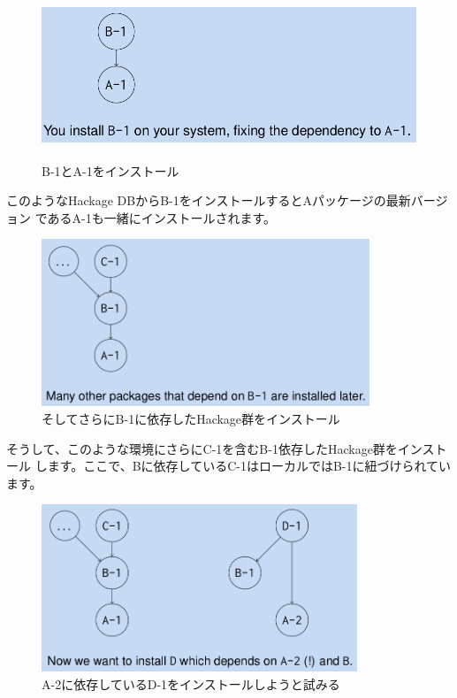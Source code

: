 \documentclass[mingoth,a4paper]{jsarticle}
\begin{document}
\begin{figure}[ht]
  \begin{center}
    \includegraphics[height=5cm]{image201110/cabal-2.png}
  \end{center}
  \label{fig:cabal-2}\caption{B-1とA-1をインストール}
\end{figure}

このようなHackage DBからB-1をインストールするとAパッケージの最新バージョン
であるA-1も一緒にインストールされます。

\begin{figure}[ht]
  \begin{center}
    \includegraphics[height=5cm]{image201110/cabal-3.png}
  \end{center}
  \label{fig:cabal-3}\caption{そしてさらにB-1に依存したHackage群をインストール}
\end{figure}

そうして、このような環境にさらにC-1を含むB-1依存したHackage群をインストール
します。ここで、Bに依存しているC-1はローカルではB-1に紐づけられています。

\begin{figure}[ht]
  \begin{center}
    \includegraphics[height=5cm]{image201110/cabal-4.png}
  \end{center}
  \label{fig:cabal-4}\caption{A-2に依存しているD-1をインストールしようと試みる}
\end{figure}
\end{document}
